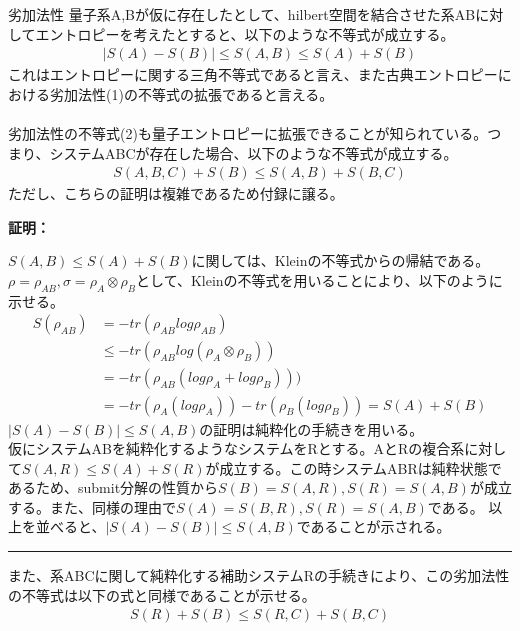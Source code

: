 \documentclass[a4paper,10.5pt]{article}
\numberwithin{equation}{section}
\newenvironment{proofbox}
{\begin{prooflabel}\textbf{証明：}\end{prooflabel}\vspace{0.8em}}
{\par\vspace{1em}\hrule\vspace{1em}}
\begin{document}
\begin{theorembox}{劣加法性}
量子系A,Bが仮に存在したとして、hilbert空間を結合させた系ABに対してエントロピーを考えたとすると、以下のような不等式が成立する。
\begin{equation}\begin{split}
    |S(A)-S(B)|\leq S(A,B) \leq S(A)+S(B)
\end{split} \end{equation}
これはエントロピーに関する三角不等式であると言え、また古典エントロピーにおける劣加法性(1)の不等式の拡張であると言える。\\
\\
劣加法性の不等式(2)も量子エントロピーに拡張できることが知られている。つまり、システムABCが存在した場合、以下のような不等式が成立する。
\begin{equation}\begin{split}
    S(A,B,C)+S(B) \leq S(A,B) +S(B,C)
\end{split} \end{equation}
ただし、こちらの証明は複雑であるため付録に譲る。
\end{theorembox}
\begin{proofbox}
$S(A,B) \leq S(A)+S(B)$に関しては、Kleinの不等式からの帰結である。$\rho=\rho_{AB},\sigma=\rho_{A}\otimes \rho_{B}$として、Kleinの不等式を用いることにより、以下のように示せる。
\begin{equation}\begin{split}
    S(\rho_{AB}) &=-tr(\rho_{AB}log\rho_{AB}) \\
    &\leq -tr(\rho_{AB}log(\rho_{A}\otimes \rho_{B}))\\
    &= -tr(\rho_{AB}(log\rho_{A} + log\rho_{B})))\\
    &= -tr(\rho_{A}(log\rho_{A})) -tr(\rho_{B}(log\rho_{B}))=S(A)+S(B)
\end{split} \end{equation}
$|S(A)-S(B)|\leq S(A,B)$の証明は純粋化の手続きを用いる。\\
仮にシステムABを純粋化するようなシステムをRとする。AとRの複合系に対して$S(A,R) \leq S(A)+S(R)$が成立する。この時システムABRは純粋状態であるため、submit分解の性質から$S(B)=S(A,R),S(R)=S(A,B)$が成立する。また、同様の理由で$S(A)=S(B,R),S(R)=S(A,B)$である。
以上を並べると、$|S(A)-S(B)|\leq S(A,B)$であることが示される。
\end{proofbox}
また、系ABCに関して純粋化する補助システムRの手続きにより、この劣加法性の不等式は以下の式と同様であることが示せる。
\begin{equation}\begin{split}
    S(R)+S(B) \leq S(R,C) + S(B,C)
\end{split} \end{equation}
\end{document}
